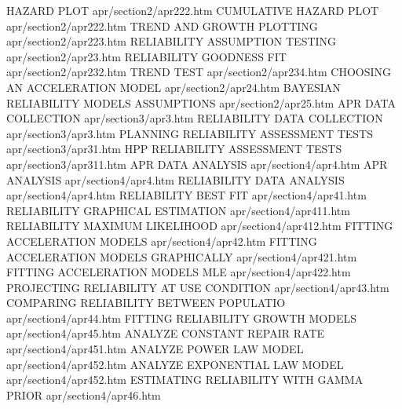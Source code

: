 HAZARD PLOT                             apr/section2/apr222.htm
CUMULATIVE HAZARD PLOT                  apr/section2/apr222.htm
TREND AND GROWTH PLOTTING               apr/section2/apr223.htm
RELIABILITY ASSUMPTION TESTING          apr/section2/apr23.htm
RELIABILITY GOODNESS FIT                apr/section2/apr232.htm
TREND TEST                              apr/section2/apr234.htm
CHOOSING AN ACCELERATION MODEL          apr/section2/apr24.htm
BAYESIAN RELIABILITY MODELS ASSUMPTIONS apr/section2/apr25.htm
APR DATA COLLECTION                     apr/section3/apr3.htm
RELIABILITY DATA COLLECTION             apr/section3/apr3.htm
PLANNING RELIABILITY ASSESSMENT TESTS   apr/section3/apr31.htm
HPP RELIABILITY ASSESSMENT TESTS        apr/section3/apr311.htm
APR DATA ANALYSIS                       apr/section4/apr4.htm
APR ANALYSIS                            apr/section4/apr4.htm
RELIABILITY DATA ANALYSIS               apr/section4/apr4.htm
RELIABILITY BEST FIT                    apr/section4/apr41.htm
RELIABILITY GRAPHICAL ESTIMATION        apr/section4/apr411.htm
RELIABILITY MAXIMUM LIKELIHOOD          apr/section4/apr412.htm
FITTING ACCELERATION MODELS             apr/section4/apr42.htm
FITTING ACCELERATION MODELS GRAPHICALLY apr/section4/apr421.htm
FITTING ACCELERATION MODELS MLE         apr/section4/apr422.htm
PROJECTING RELIABILITY AT USE CONDITION apr/section4/apr43.htm
COMPARING RELIABILITY BETWEEN POPULATIO apr/section4/apr44.htm
FITTING RELIABILITY GROWTH MODELS       apr/section4/apr45.htm
ANALYZE CONSTANT REPAIR RATE            apr/section4/apr451.htm
ANALYZE POWER LAW MODEL                 apr/section4/apr452.htm
ANALYZE EXPONENTIAL LAW MODEL           apr/section4/apr452.htm
ESTIMATING RELIABILITY WITH GAMMA PRIOR apr/section4/apr46.htm
